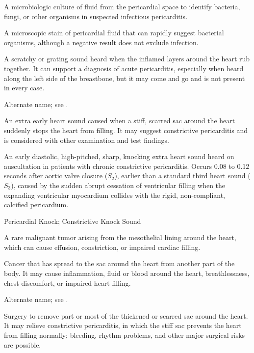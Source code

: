  A microbiologic culture of fluid from the pericardial space to identify bacteria, fungi, or other organisms in suspected infectious pericarditis.

 A microscopic stain of pericardial fluid that can rapidly suggest bacterial organisms, although a negative result does not exclude infection.

 A scratchy or grating sound heard when the inflamed layers around the heart rub together. It can support a diagnosis of acute pericarditis, especially when heard along the left side of the breastbone, but it may come and go and is not present in every case.

 Alternate name; see .

 An extra early heart sound caused when a stiff, scarred sac around the heart suddenly stops the heart from filling. It may suggest constrictive pericarditis and is considered with other examination and test findings.

 An early diastolic, high-pitched, sharp, knocking extra heart sound heard on auscultation in patients with chronic constrictive pericarditis. Occurs 0.08 to 0.12 seconds after aortic valve closure ($S_2$), earlier than a standard third heart sound ($S_3$), caused by the sudden abrupt cessation of ventricular filling when the expanding ventricular myocardium collides with the rigid, non-compliant, calcified pericardium.

\synonyms
Pericardial Knock; Constrictive Knock Sound

 A rare malignant tumor arising from the mesothelial lining around the heart, which can cause effusion, constriction, or impaired cardiac filling.

 Cancer that has spread to the sac around the heart from another part of the body. It may cause inflammation, fluid or blood around the heart, breathlessness, chest discomfort, or impaired heart filling.

 Alternate name; see .

 Surgery to remove part or most of the thickened or scarred sac around the heart. It may relieve constrictive pericarditis, in which the stiff sac prevents the heart from filling normally; bleeding, rhythm problems, and other major surgical risks are possible.

